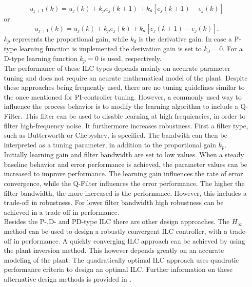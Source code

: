 \begin{equation}
    u_{j+1}(k) = u_{j}(k)+k_{p}e_{j}(k+1)+k_{d}[e_{j}(k+1)-e_{j}(k)]
 \label{eq:PD_type}
 \end{equation}
 or
 \begin{equation}
     u_{j+1}(k) = u_{j}(k)+k_{p}e_{j}(k)+k_{d}[e_{j}(k+1)-e_{j}(k)].
  \label{eq:PD_type_2}
  \end{equation}
$k_{p}$ represents the proportional gain, while $k_{d}$ is the derivative gain. In case a P-type learning function is implemented the derivation gain is set to $k_{d}=0$. For a D-type learning function $k_{p}=0$ is used, respectively.
\\The performance of these ILC types depends mainly on accurate parameter tuning and does not require an acurate mathematical model of the plant. Despite these approaches being frequently used, there are no tuning guidelines similar to the once mentioned for PI-controller tuning. However, a commonly used way to influence the process behavior is to modify the learning algorithm to include a Q-Filter. This filter can be used to disable learning at high frequiencies, in order to filter high-frequency noise. It furthermore increases robustness. First a filter type, such as Butterworth or Chebyshev, is specified. The bandwith can then be interpreted as a tuning parameter, in addition to the proportional gain $k_{p}$. Initially learning gain and filter bandwidth are set to low values. When a steady baseline behavior and error performance is achieved, the parameter values can be increased to improve performance. The learning gain influences the rate of error convergence, while the Q-Filter influences the error performance. The higher the filter bandwidth, the more increased is the performance. However, this includes a trade-off in robustness. For lower filter bandwidth high robustness can be achieved in a trade-off in performance.
\\Besides the P-,D- and PD-type ILC there are other design approaches. The $H_{\infty}$ method can be used to design a robustly convergent ILC controller, with a trade-off in performance. A quickly converging ILC approach can be achieved by using the plant inversion method. This however depends greatly on an accurate modeling of the plant. The quadratically optimal ILC approach uses quadratic performance criteria to design an optimal ILC. Further information on these alternative design methods is provided in \cite{ILC2}.
